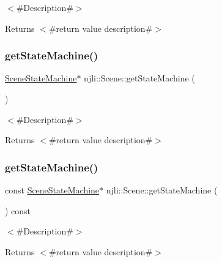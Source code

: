 $<$\#\+Description\#$>$

\begin{DoxyReturn}{Returns}
$<$\#return value description\#$>$ 
\end{DoxyReturn}
\mbox{\label{classnjli_1_1_scene_affbc7b7b0c3ad6bc2cba663e4359fc2d}} 
\subsubsection{\texorpdfstring{get\+State\+Machine()}{getStateMachine()}\hspace{0.1cm}{\footnotesize\ttfamily [1/2]}}
{\footnotesize\ttfamily \mbox{\hyperlink{classnjli_1_1_scene_state_machine}{Scene\+State\+Machine}}$\ast$ njli\+::\+Scene\+::get\+State\+Machine (\begin{DoxyParamCaption}{ }\end{DoxyParamCaption})}

$<$\#\+Description\#$>$

\begin{DoxyReturn}{Returns}
$<$\#return value description\#$>$ 
\end{DoxyReturn}
\mbox{\label{classnjli_1_1_scene_a8975e7ec684eaea3563acd6c10f50814}} 
\subsubsection{\texorpdfstring{get\+State\+Machine()}{getStateMachine()}\hspace{0.1cm}{\footnotesize\ttfamily [2/2]}}
{\footnotesize\ttfamily const \mbox{\hyperlink{classnjli_1_1_scene_state_machine}{Scene\+State\+Machine}}$\ast$ njli\+::\+Scene\+::get\+State\+Machine (\begin{DoxyParamCaption}{ }\end{DoxyParamCaption}) const}

$<$\#\+Description\#$>$

\begin{DoxyReturn}{Returns}
$<$\#return value description\#$>$ 
\end{DoxyReturn}
\mbox{\label{classnjli_1_1_scene_ad964360f4cf41a7db15a1407bc4d551d}} 
